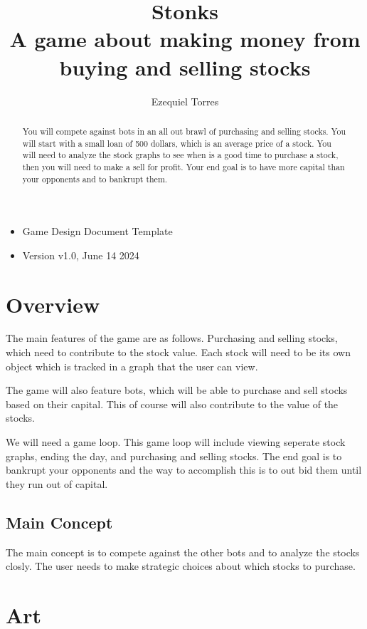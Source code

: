 \documentclass{report}
\title{Stonks \large \\
A game about making money from buying and selling stocks}
\author{Ezequiel Torres}
\begin{document}
\maketitle 
\begin{itemize}
    \item Game Design Document Template
    \item Version v1.0, June 14 2024\\
\end{itemize}
\newpage
\tableofcontents

\begin{abstract}
You will compete against bots in an all out brawl of purchasing and selling stocks. You will start with a small loan of 500 dollars, which is an average price of a stock. You will need to analyze the stock graphs to see when is a good time to purchase a stock, then you will need to make a sell for profit. Your end goal is to have more capital than your opponents and to bankrupt them.
\end{abstract}
\chapter{Overview}

The main features of the game are as follows. Purchasing and selling stocks, which need to contribute to the stock value. Each stock will need to be its own object which is tracked in a graph that the user can view. 

The game will also feature bots, which will be able to purchase and sell stocks based on their capital. This of course will also contribute to the value of the stocks. 

We will need a game loop. This game loop will include viewing seperate stock graphs, ending the day, and purchasing and selling stocks. The end goal is to bankrupt your opponents and the way to accomplish this is to out bid them until they run out of capital. 

\section{Main Concept}
The main concept is to compete against the other bots and to analyze the stocks closly. The user needs to make strategic choices about which stocks to purchase.

\chapter{Art}
\end{document}
